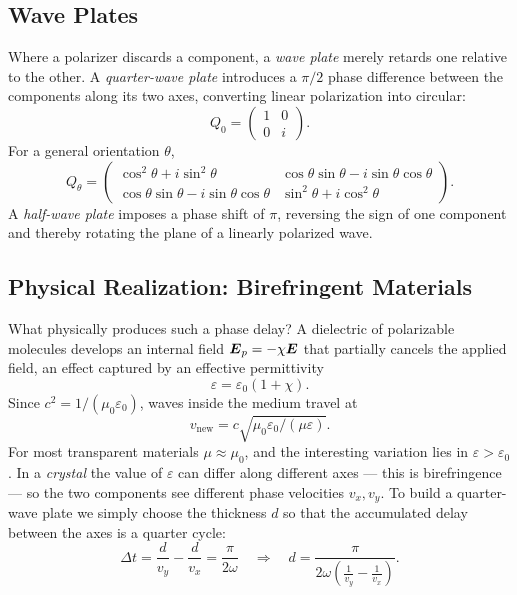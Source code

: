 \subsection{Wave Plates}

Where a polarizer discards a component, a \emph{wave plate} merely retards one relative to the other. A \emph{quarter-wave plate} introduces a $\pi/2$ phase difference between the components along its two axes, converting linear polarization into circular:
\begin{equation}
    Q_0 = \begin{pmatrix} 1 & 0 \\ 0 & i \end{pmatrix}.
\end{equation}
For a general orientation $\theta$,
\begin{equation}
    Q_\theta = \begin{pmatrix} \cos^2\theta + i\sin^2\theta & \cos\theta\sin\theta - i\sin\theta\cos\theta \\ \cos\theta\sin\theta - i\sin\theta\cos\theta & \sin^2\theta + i\cos^2\theta \end{pmatrix}.
\end{equation}
A \emph{half-wave plate} imposes a phase shift of $\pi$, reversing the sign of one component and thereby rotating the plane of a linearly polarized wave.

\subsection{Physical Realization: Birefringent Materials}

What physically produces such a phase delay? A dielectric of polarizable molecules develops an internal field $\vect{E}_p = -\chi\vect{E}$ that partially cancels the applied field, an effect captured by an effective permittivity
\begin{equation}
    \varepsilon = \varepsilon_0(1 + \chi).
\end{equation}
Since $c^2 = 1/(\mu_0\varepsilon_0)$, waves inside the medium travel at
\begin{equation}
    v_{\text{new}} = c\sqrt{\mu_0\varepsilon_0/(\mu\varepsilon)}.
\end{equation}
For most transparent materials $\mu \approx \mu_0$, and the interesting variation lies in $\varepsilon > \varepsilon_0$. In a \emph{crystal} the value of $\varepsilon$ can differ along different axes --- this is birefringence --- so the two components see different phase velocities $v_x, v_y$. To build a quarter-wave plate we simply choose the thickness $d$ so that the accumulated delay between the axes is a quarter cycle:
\begin{equation}
    \Delta t = \frac{d}{v_y} - \frac{d}{v_x} = \frac{\pi}{2\omega}
    \quad\Longrightarrow\quad
    d = \frac{\pi}{2\omega\!\left(\tfrac{1}{v_y} - \tfrac{1}{v_x}\right)}.
\end{equation}

